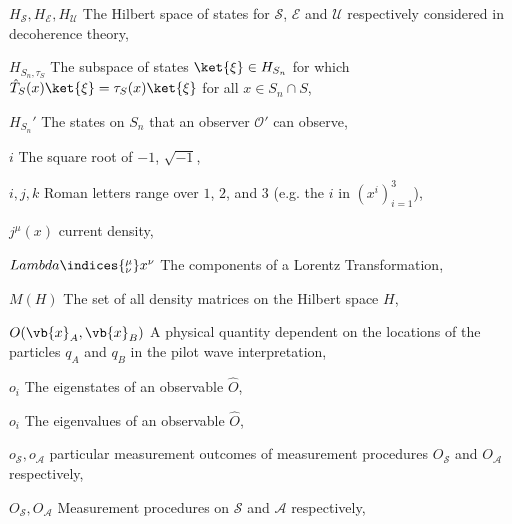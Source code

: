\begin{thenomenclature}
      \item [{$H_{\mathcal{S}}, H_{\mathcal{E}}, H_{\mathcal{U}}$}]\begingroup The Hilbert space of states for $\mathcal{S}$, $\mathcal{E}$ and $\mathcal{U}$ respectively considered in decoherence theory, \nomrefpage{}
      \item [{$H_{S_n,\tau_S}\label{HStau}$}]\begingroup The subspace of states $\ket{\xi}\in  H_{S_n}$ for which  $\hat{T}_S(x)\ket{\xi}=\tau_S(x)\ket{\xi}$  for all $x\in S_n\cap S$, \nomrefpage{}
      \item [{$H_{S_n}'$}]\begingroup The states on $S_n$ that an observer $\mathcal{O}'$ can observe, \nomrefpage{}
      \item [{$i$}]\begingroup The square root of $-1$, $\sqrt {-1}$, \nomrefpage {}
      \item [{$i,j,k$}]\begingroup Roman letters range over $1$, $2$, and $3$ (e.g. the $i$ in $(x^i)_{i=1}^3$), \nomrefpage{}
      \item [{$j^\mu (x)$}]\begingroup current density, \nomrefpage {}
      \item [{$Lambda\indices{^\mu_\nu}x^\nu$}]\begingroup The components of a Lorentz Transformation, \nomrefpage{}
      \item [{$M(H)$}]\begingroup The set of all density matrices on the Hilbert space $H$, \nomrefpage{}
      \item [{$O(\vb{x}_A, \vb{x}_B)$}]\begingroup A physical quantity dependent on the locations of the particles $q_A$ and $q_B$ in the pilot wave interpretation, \nomrefpage{}
      \item [{$o_i$}]\begingroup The eigenstates of an observable $\hat{O}$, \nomrefpage{}
      \item [{$o_i$}]\begingroup The eigenvalues of an observable $\hat{O}$, \nomrefpage{}
      \item [{$o_{\mathcal{S}}, o_{\mathcal{A}}$}]\begingroup particular measurement outcomes of measurement procedures $O_{\mathcal{S}}$ and $O_{\mathcal{A}}$ respectively, \nomrefpage{}
      \item [{$O_{\mathcal{S}}, O_{\mathcal{A}}$ }]\begingroup Measurement procedures on $\mathcal{S}$ and $\mathcal{A}$ respectively, \nomrefpage{}

\end{thenomenclature}
